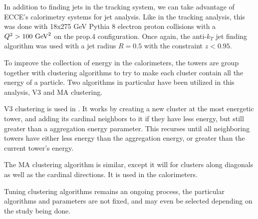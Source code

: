 In addition to finding jets in the tracking system, we can take advantage of ECCE's calorimetry systems for jet analysis.  Like in the tracking analysis, this was done with 18x275 GeV Pythia 8 electron proton collisions with a $Q^2>100\hbox{ GeV}^2$ on the prop.4 configuration.  Once again, the anti-$k_T$ jet finding algorithm was used with a jet radius $R=0.5$ with the constraint $z<0.95$.  

To improve the collection of energy in the calorimeters, the towers are group together with clustering algorithms to try to make each cluster contain all the energy of a particle.  Two algorithms in particular have been utilized in this analysis, V3 and MA clustering.

V3 clustering is used in .  It works by creating a new cluster at the most energetic tower, and adding its cardinal neighbors to it if they have less energy, but still greater than a aggregation energy parameter.  This recurses until all neighboring towers have either less energy than the aggregation energy, or greater than the current tower's energy.

The MA clustering algorithm is similar, except it will for clusters along diagonals as well as the cardinal directions.  It is used in the  calorimeters.  

Tuning clustering algorithms remains an ongoing process, the particular algorithms and parameters are not fixed, and may even be selected depending on the study being done. 



